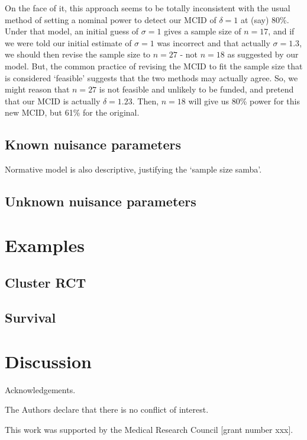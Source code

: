 \documentclass[sagev]{sagej}
\begin{document}
On the face of it, this approach seems to be totally inconsistent with the usual method of setting a nominal power to detect our MCID of $\delta = 1$ at (say) 80\%. Under that model, an initial guess of $\sigma = 1$ gives a sample size of $n = 17$, and if we were told our initial estimate of $\sigma = 1$ was incorrect and that actually $\sigma = 1.3$, we should then revise the sample size to $n = 27$ - not $n = 18$ as suggested by our model. But, the common practice of revising the MCID to fit the sample size that is considered `feasible' suggests that the two methods may actually agree. So, we might reason that $n = 27$ is not feasible and unlikely to be funded, and pretend that our MCID is actually $\delta = 1.23$. Then, $n = 18$ will give us 80\% power for this new MCID, but 61\% for the original.

\subsection{Known nuisance parameters}

Normative model is also descriptive, justifying the `sample size samba'.

\subsection{Unknown nuisance parameters}



\section{Examples}

\subsection{Cluster RCT}

\subsection{Survival}

\section{Discussion}

\begin{acks}
Acknowledgements.
\end{acks}

\begin{dci}
The Authors declare that there is no conflict of interest.
\end{dci}

\begin{funding}
This work was supported by the Medical Research Council [grant number xxx].
\end{funding}



\end{document}
